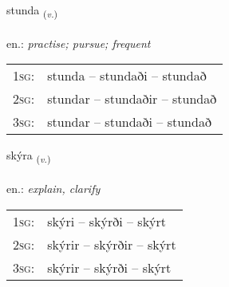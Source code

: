 \documentclass[frontgrid, backgrid]{flacards}\usepackage[]{graphicx}\usepackage[]{xcolor}
\begin{document}
\renewcommand{\flhead}{\vskip5pt \fboxsep=0pt {\small\bfseries\footnotesize Sagnorð | Verb}}
\renewcommand{\fcfoot}{\vskip5pt \fboxsep=0pt \hspace{2pt}{\small\bfseries\footnotesize 1K}}

\renewcommand{\blhead}{\vskip5pt {\small\bfseries\footnotesize Sagnorð | Verb }}
\renewcommand{\bcfoot}{\vskip5pt \hspace{2pt}{\small\bfseries\footnotesize 1K}}


{stunda \small{\textsubscript{(\textit{v.})}} \\[1ex] %
\textphonetic{[stʏnta]} \\
en.: \emph{practise; pursue; frequent} \\  [2ex]
\renewcommand*{\arraystretch}{0.8}
\begin{tabular}{p{1cm}l}
\textsc{1sg}: & stunda -- stundaði -- stundað \\ 
\textsc{2sg}: & stundar -- stundaðir -- stundað \\ 
\textsc{3sg}: & stundar -- stundaði -- stundað \\ 
\end{tabular}
}

\renewcommand{\flhead}{\vskip5pt \fboxsep=0pt {\small\bfseries\footnotesize Sagnorð | Verb}}
\renewcommand{\fcfoot}{\vskip5pt \fboxsep=0pt \hspace{2pt}{\small\bfseries\footnotesize 1K}}

\renewcommand{\blhead}{\vskip5pt {\small\bfseries\footnotesize Sagnorð | Verb }}
\renewcommand{\bcfoot}{\vskip5pt \hspace{2pt}{\small\bfseries\footnotesize 1K}}


{skýra \small{\textsubscript{(\textit{v.})}} \\[1ex] %
\textphonetic{[sciːra]} \\
en.: \emph{explain, clarify} \\  [2ex]
\renewcommand*{\arraystretch}{0.8}
\begin{tabular}{p{1cm}l}
\textsc{1sg}: & skýri -- skýrði -- skýrt \\ 
\textsc{2sg}: & skýrir -- skýrðir -- skýrt \\ 
\textsc{3sg}: & skýrir -- skýrði -- skýrt \\ 
\end{tabular}
}
\end{document}
